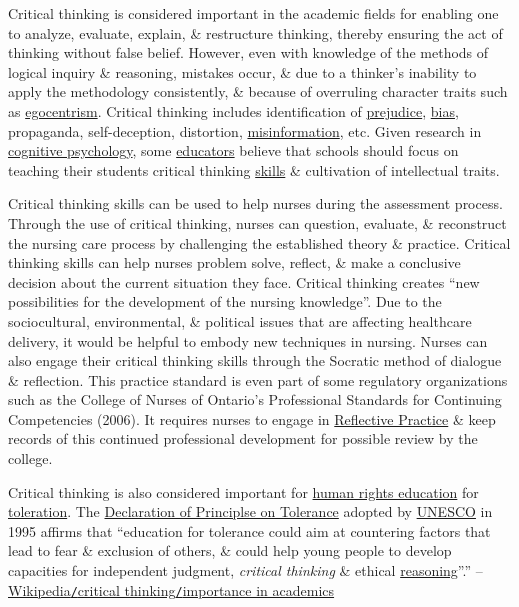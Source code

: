 \documentclass[oneside]{book}
\numberwithin{equation}{section}
\begin{document}
Critical thinking is considered important in the academic fields for enabling one to analyze, evaluate, explain, \& restructure thinking, thereby ensuring the act of thinking without false belief. However, even with knowledge of the methods of logical inquiry \& reasoning, mistakes occur, \& due to a thinker's inability to apply the methodology consistently, \& because of overruling character traits such as \href{https://en.wikipedia.org/wiki/Egocentrism}{egocentrism}. Critical thinking includes identification of \href{https://en.wikipedia.org/wiki/Prejudice}{prejudice}, \href{https://en.wikipedia.org/wiki/Bias}{bias}, propaganda, self-deception, distortion, \href{https://en.wikipedia.org/wiki/Misinformation}{misinformation}, etc. Given research in \href{https://en.wikipedia.org/wiki/Cognitive_psychology}{cognitive psychology}, some \href{https://en.wikipedia.org/wiki/Education}{educators} believe that schools should focus on teaching their students critical thinking \href{https://en.wikipedia.org/wiki/Skill}{skills} \& cultivation of intellectual traits.

Critical thinking skills can be used to help nurses during the assessment process. Through the use of critical thinking, nurses can question, evaluate, \& reconstruct the nursing care process by challenging the established theory \& practice. Critical thinking skills can help nurses problem solve, reflect, \& make a conclusive decision about the current situation they face. Critical thinking creates ``new possibilities for the development of the nursing knowledge''. Due to the sociocultural, environmental, \& political issues that are affecting healthcare delivery, it would be helpful to embody new techniques in nursing. Nurses can also engage their critical thinking skills through the Socratic method of dialogue \& reflection. This practice standard is even part of some regulatory organizations such as the College of Nurses of Ontario's Professional Standards for Continuing Competencies (2006). It requires nurses to engage in \href{https://en.wikipedia.org/wiki/Reflective_Practice}{Reflective Practice} \& keep records of this continued professional development for possible review by the college.

Critical thinking is also considered important for \href{https://en.wikipedia.org/wiki/Human_rights_education}{human rights education} for \href{https://en.wikipedia.org/wiki/Toleration}{toleration}. The \href{https://en.wikipedia.org/wiki/International_Day_for_Tolerance}{Declaration of Principlse on Tolerance} adopted by \href{https://en.wikipedia.org/wiki/UNESCO}{UNESCO} in 1995 affirms that ``education for tolerance could aim at countering factors that lead to fear \& exclusion of others, \& could help young people to develop capacities for independent judgment, \textit{critical thinking} \& ethical \href{https://en.wikipedia.org/wiki/Reasoning}{reasoning}''.'' -- \href{https://en.wikipedia.org/wiki/Critical_thinking#Importance_in_academics}{Wikipedia\texttt{/}critical thinking\texttt{/}importance in academics}
\end{document}
